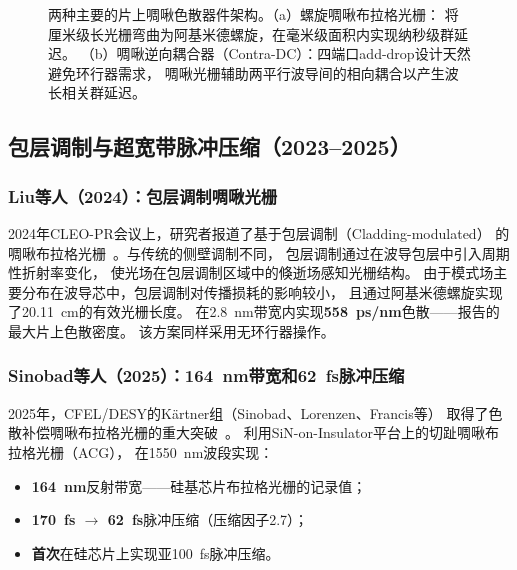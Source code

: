 \documentclass[12pt,a4paper,twoside]{article}
\begin{document}
\begin{figure}[p]
\caption{两种主要的片上啁啾色散器件架构。（a）螺旋啁啾布拉格光栅：
将厘米级长光栅弯曲为阿基米德螺旋，在毫米级面积内实现纳秒级群延迟。
（b）啁啾逆向耦合器（Contra-DC）：四端口add-drop设计天然避免环行器需求，
啁啾光栅辅助两平行波导间的相向耦合以产生波长相关群延迟。}
\label{fig:spiral}
\end{figure}

\subsection{包层调制与超宽带脉冲压缩（2023--2025）}

\subsubsection{Liu等人（2024）：包层调制啁啾光栅}

2024年CLEO-PR会议上，研究者报道了基于包层调制（Cladding-modulated）
的啁啾布拉格光栅~\cite{liu2024a}。与传统的侧壁调制不同，
包层调制通过在波导包层中引入周期性折射率变化，
使光场在包层调制区域中的倏逝场感知光栅结构。
由于模式场主要分布在波导芯中，包层调制对传播损耗的影响较小，
且通过阿基米德螺旋实现了20.11~cm的有效光栅长度。
在2.8~nm带宽内实现\textbf{558~ps/nm}色散——报告的最大片上色散密度。
该方案同样采用无环行器操作。

\subsubsection{Sinobad等人（2025）：164~nm带宽和62~fs脉冲压缩}

2025年，CFEL/DESY的K\"{a}rtner组（Sinobad、Lorenzen、Francis等）
取得了色散补偿啁啾布拉格光栅的重大突破~\cite{sinobad2025}。
利用SiN-on-Insulator平台上的切趾啁啾布拉格光栅（ACG），
在1550~nm波段实现：
\begin{itemize}[leftmargin=*,itemsep=1pt]
\item \textbf{164~nm}反射带宽——硅基芯片布拉格光栅的记录值；
\item \textbf{170~fs $\rightarrow$ 62~fs}脉冲压缩（压缩因子2.7）；
\item \textbf{首次}在硅芯片上实现亚100~fs脉冲压缩。
\end{itemize}
\end{document}
